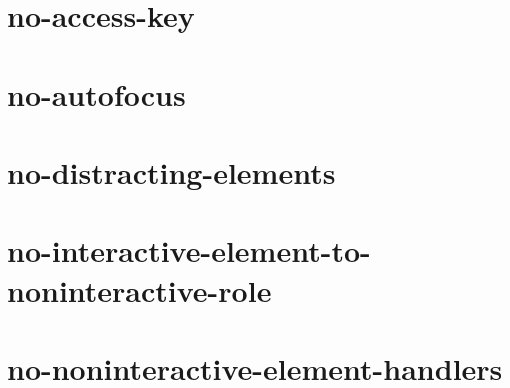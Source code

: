 \documentclass[twoside]{book}
\newcommand{\+}{\discretionary{\mbox{\scriptsize$\hookleftarrow$}}{}{}}
\begin{document}
\chapter{no-\/access-\/key}
\label{md__c_1_workspace_demo_src_main_script_node_modules_eslint-plugin-jsx-a11y_docs_rules_no-access-key}

\chapter{no-\/autofocus}
\label{md__c_1_workspace_demo_src_main_script_node_modules_eslint-plugin-jsx-a11y_docs_rules_no-autofocus}

\chapter{no-\/distracting-\/elements}
\label{md__c_1_workspace_demo_src_main_script_node_modules_eslint-plugin-jsx-a11y_docs_rules_no-distracting-elements}

\chapter{no-\/interactive-\/element-\/to-\/noninteractive-\/role}
\label{md__c_1_workspace_demo_src_main_script_node_modules_eslint-plugin-jsx-a11y_docs_rules_no-interac85fd4078c8401a949be47bdff77f4268}

\chapter{no-\/noninteractive-\/element-\/handlers}
\label{md__c_1_workspace_demo_src_main_script_node_modules_eslint-plugin-jsx-a11y_docs_rules_no-noninteractive-element-interactions}

\end{document}
